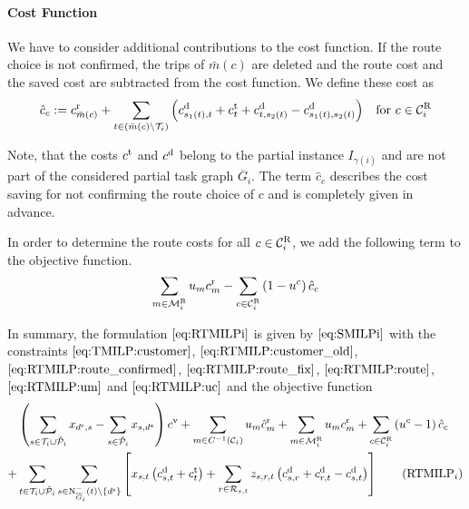 \paragraph{Cost Function} \parfill

We have to consider additional contributions to the cost function. If the route choice is not confirmed, the trips of $\bar{m}(c)$ are deleted and the route cost and the saved cost are subtracted from the cost function. We define these cost as
\begin{align*}
	\hat{c}_c := c^{\operatorname{r}}_{\bar{m}(c)} + \sum_{t\in\left(\bar{m}(c)\backslash\mathcal{T}_i\right)} \left(c^{\operatorname{d}}_{s_1(t),t}+c^{\operatorname{t}}_t+c^{\operatorname{d}}_{t,s_2(t)}-c^{\operatorname{d}}_{s_1(t),s_2(t)}\right) && \text{for } c\in\mathcal{C}^{\operatorname{R}}_i
\end{align*}

Note, that the costs $c^{\operatorname{t}}$ and $c^{\operatorname{d}}$ belong to the partial instance $I_{\gamma(i)}$ and are not part of the considered partial task graph $\overline{G}_i$. The term $\hat{c}_c$ describes the cost saving for not confirming the route choice of $c$ and is completely given in advance.

In order to determine the route costs for all $c\in\mathcal{C}^{\operatorname{R}}_i$, we add the following term to the objective function.
\begin{align*}
	\sum_{m\in\mathcal{M}^{\operatorname{R}}_i} u_m c^{\operatorname{r}}_m - \sum_{c\in\mathcal{C}^{\operatorname{R}}_i} \left(1-u^c\right)\hat{c}_c
\end{align*}

In summary, the formulation $\eqref{eq:RTMILPi}$ is given by $\eqref{eq:SMILPi}$ with the constraints $\eqref{eq:TMILP:customer}$, $\eqref{eq:RTMILP:customer_old}$, $\eqref{eq:RTMILP:route_confirmed}$, $\eqref{eq:RTMILP:route_fix}$, $\eqref{eq:RTMILP:route}$, $\eqref{eq:RTMILP:um}$ and $\eqref{eq:RTMILP:uc}$ and the objective function
\begin{align}
	&\left(\sum_{s\in\Ti\cup\Phat_i} x_{\ds,s} - \sum_{s\in\Phat_i} x_{s,\de}\right)\cv + \sum_{m\in C^{-1}\left(\mathcal{C}_i\right)} u_m \hat{c}^{\operatorname{r}}_m + \sum_{m\in\MR_i} u_m \croute_m + \sum_{c\in\CR_i} \left(u^c - 1\right)\hat{c}_c \nonumber \\
	+ & \sum_{t\in\Ti\cup\Phat_i}\sum_{s\in\Ninoi(t)\backslash\left\{\ds\right\}}\left[x_{s,t}\left(\cd_{s,t}+\ct_t\right)+\sum_{r\in\Rst}z_{s,r,t}\left(\cd_{s,r}+\cd_{r,t}-\cd_{s,t}\right)\right] \tag{$\operatorname{RTMILP}_i$} \label{eq:RTMILPi}
\end{align}


